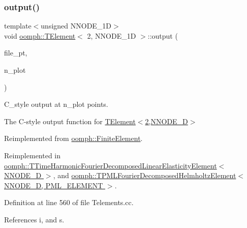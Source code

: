 \subsubsection{\texorpdfstring{output()}{output()}\hspace{0.1cm}{\footnotesize\ttfamily [4/4]}}
{\footnotesize\ttfamily template$<$unsigned N\+N\+O\+D\+E\+\_\+1D$>$ \\
void \hyperlink{classoomph_1_1TElement}{oomph\+::\+T\+Element}$<$ 2, N\+N\+O\+D\+E\+\_\+1D $>$\+::output (\begin{DoxyParamCaption}\item[{F\+I\+LE $\ast$}]{file\+\_\+pt,  }\item[{const unsigned \&}]{n\+\_\+plot }\end{DoxyParamCaption})\hspace{0.3cm}{\ttfamily [virtual]}}



C\+\_\+style output at n\+\_\+plot points. 

The C-\/style output function for \hyperlink{classoomph_1_1TElement_3_012_00_01NNODE__1D_01_4}{T\+Element$<$2,\+N\+N\+O\+D\+E\+\_\+D$>$} 

Reimplemented from \hyperlink{classoomph_1_1FiniteElement_adfaee690bb0608f03320eeb9d110d48c}{oomph\+::\+Finite\+Element}.



Reimplemented in \hyperlink{classoomph_1_1TTimeHarmonicFourierDecomposedLinearElasticityElement_a05e2f49a9bd2941f4bbabd5f0279d86a}{oomph\+::\+T\+Time\+Harmonic\+Fourier\+Decomposed\+Linear\+Elasticity\+Element$<$ N\+N\+O\+D\+E\+\_\+D $>$}, and \hyperlink{classoomph_1_1TPMLFourierDecomposedHelmholtzElement_aec6440de61dd7cd76b77ddd7732744d4}{oomph\+::\+T\+P\+M\+L\+Fourier\+Decomposed\+Helmholtz\+Element$<$ N\+N\+O\+D\+E\+\_\+D, P\+M\+L\+\_\+\+E\+L\+E\+M\+E\+N\+T $>$}.



Definition at line 560 of file Telements.\+cc.



References i, and s.

\mbox{\label{classoomph_1_1TElement_3_012_00_01NNODE__1D_01_4_a5e7b1d34547ad697dd89e73944e5bfd1}} 
